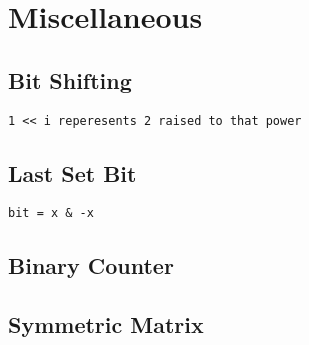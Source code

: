 \section{Miscellaneous}

\subsection{Bit Shifting}
\begin{lstlisting}[style=CStyle]
1 << i reperesents 2 raised to that power
\end{lstlisting}


\subsection{Last Set Bit}
\begin{lstlisting}[style=CStyle]
bit = x & -x
\end{lstlisting}


\subsection{Binary Counter}



\subsection{Symmetric Matrix}
\begin{lstlisting}

\end{lstlisting}
